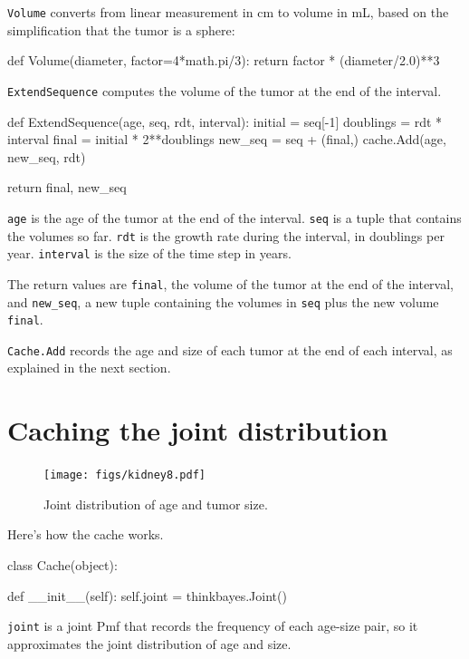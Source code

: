 \documentclass[12pt]{book}
\theoremstyle{exercise}
\begin{document}
{\tt Volume} converts from linear measurement in cm to volume
in mL, based on the simplification that the tumor is a sphere:

\begin{code}
def Volume(diameter, factor=4*math.pi/3):
    return factor * (diameter/2.0)**3
\end{code}

{\tt ExtendSequence} computes the volume of the tumor at the
end of the interval.

\begin{code}
def ExtendSequence(age, seq, rdt, interval):
    initial = seq[-1]
    doublings = rdt * interval
    final = initial * 2**doublings
    new_seq = seq + (final,)
    cache.Add(age, new_seq, rdt)
    
    return final, new_seq
\end{code}

{\tt age} is the age of the tumor at the end of the interval.
{\tt seq} is a tuple that contains the volumes so far.  {\tt rdt} is
the growth rate during the interval, in doublings per year.
{\tt interval} is the size of the time step in years.

The return values are {\tt final}, the volume of the
tumor at the end of the interval, and \verb"new_seq", a new
tuple containing the volumes in {\tt seq} plus the new volume
{\tt final}.

{\tt Cache.Add} records the age and size of each tumor at the end
of each interval, as explained in the next section.


\section{Caching the joint distribution}

\begin{figure}
\centerline{\texttt{[image: figs/kidney8.pdf]}}
\caption{Joint distribution of age and tumor size.}
\label{fig.kidney8}
\end{figure}

Here's how the cache works.  

\begin{code}
class Cache(object):

    def __init__(self):
        self.joint = thinkbayes.Joint()
\end{code}

{\tt joint} is a joint Pmf that records the
frequency of each age-size pair, so it approximates the
joint distribution of age and size.
\end{document}
